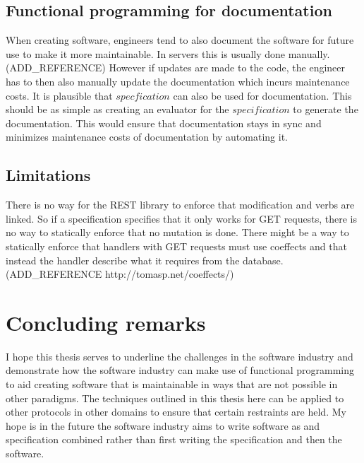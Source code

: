 \subsection{Functional programming for documentation}

When creating software, engineers tend to also document the software for future
use to make it more maintainable. In servers this is usually done manually.
(ADD\_REFERENCE) However if updates are made to the code, the engineer has to
then also manually update the documentation which incurs maintenance costs. It
is plausible that $specfication$ can also be used for documentation. This
should be as simple as creating an evaluator for the $specification$ to
generate the documentation. This would ensure that documentation stays in sync
and minimizes maintenance costs of documentation by automating it.

\subsection{Limitations}

There is no way for the REST library to enforce that modification and verbs are
linked. So if a specification specifies that it only works for GET requests,
there is no way to statically enforce that no mutation is done. There might be a
way to statically enforce that handlers with GET requests must use coeffects and
that instead the handler describe what it requires from the
database.(ADD\_REFERENCE http://tomasp.net/coeffects/)

\section{Concluding remarks}

I hope this thesis serves to underline the challenges in the software industry
and demonstrate how the software industry can make use of functional programming
to aid creating software that is maintainable in ways that are not possible in
other paradigms. The techniques outlined in this thesis here can be applied to
other protocols in other domains to ensure that certain restraints are held. My
hope is in the future the software industry aims to write software as and
specification combined rather than first writing the specification and then the
software. 
